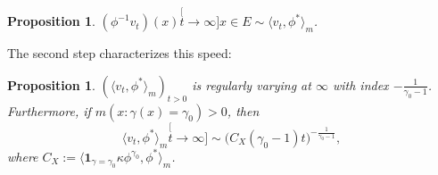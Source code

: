 \documentclass[12pt, a4paper]{amsart}
\newtheorem{prop}[thm]{Proposition}
\theoremstyle{definition}
\numberwithin{equation}{section}
\begin{document}
\begin{prop}
\label{prop: convergence in a same speed}
	$(\phi^{-1}v_t)(x) \stackrel[t\to\infty]{x\in E}{\sim} \langle v_t,\phi^*\rangle_m$.
\end{prop}
\label{prop: asymptotic equivalence of vtphi}
	The second step characterizes this speed:
\begin{prop}
\label{prop: regularly varying of vt-phi-star}
	$(\langle v_t,\phi^*\rangle_m)_{t> 0} $ is regularly varying at $\infty$ with index $-\frac{1}{\gamma_0-1}$.
	Furthermore, if $m(x: \gamma (x)= \gamma_0)>0$, then
\begin{equation}
	\langle v_t,\phi^*\rangle_m
	\stackrel[t\to \infty]{}{\sim} \big(C_X(\gamma_0-1) t \big)^{-\frac{1}{\gamma_0 - 1}},
\end{equation}
	where $C_X:= \langle \mathbf 1_{\gamma= \gamma_0} \kappa \phi^{\gamma_0}, \phi^* \rangle_m $.
\end{prop}

\end{document}
